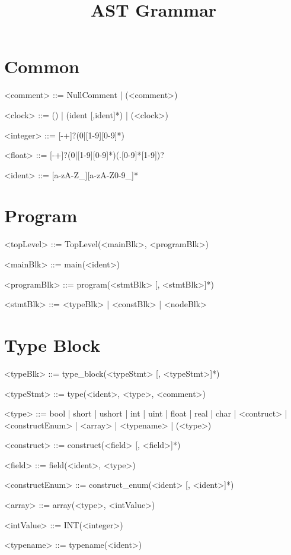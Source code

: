 \documentclass{article}
\title{\bf AST Grammar}
\begin{document}
\maketitle

\section{Common}
\begin{grammar} \small

<comment> ::= NullComment | (<comment>)

<clock> ::= () | (ident [,ident]*) | (<clock>)

<integer> ::= [-+]?(0|[1-9][0-9]*)

<float> ::= [-+]?(0|[1-9][0-9]*)(.[0-9]*[1-9])?

<ident> ::= [a-zA-Z_][a-zA-Z0-9_]*

\end{grammar}

\section{Program}
\begin{grammar} \small

<topLevel> ::= TopLevel(<mainBlk>, <programBlk>)

<mainBlk> ::= main(<ident>)

<programBlk> ::= program(<stmtBlk> [, <stmtBlk>]*)

<stmtBlk> ::= <typeBlk> | <constBlk> | <nodeBlk>


\end{grammar}

\section{Type Block}
\begin{grammar} \small

<typeBlk> ::= type_block(<typeStmt> [, <typeStmt>]*)

<typeStmt> ::= type(<ident>, <type>, <comment>)

<type> ::= bool | short | ushort | int | uint | float | real | char | <contruct> | <constructEnum> | <array> | <typename> | (<type>)

<construct> ::= construct(<field> [, <field>]*)

<field> ::= field(<ident>, <type>)

<constructEnum> ::= construct_enum(<ident> [, <ident>]*)

<array> ::= array(<type>, <intValue>)

<intValue> ::= INT(<integer>)

<typename> ::= typename(<ident>)

\end{grammar}
\end{document}
